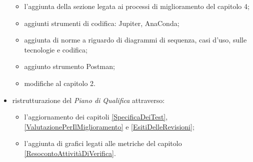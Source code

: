 \begin{itemize}
	\begin{itemize}
		\item l'aggiunta della sezione legata ai processi di miglioramento del capitolo 4;
		\item aggiunti strumenti di codifica: Jupiter, AnaConda;
		\item aggiunta di norme a riguardo di diagrammi di sequenza, casi d'uso, sulle tecnologie e codifica;
		\item aggiunto strumento Postman;
		\item modifiche al capitolo 2.
	\end{itemize}
	\item ristrutturazione del \textit{Piano di Qualifica} attraverso:
	\begin{itemize}
		\item l'aggiornamento dei capitoli \ref{SpecificaDeiTest}, \ref{ValutazionePerIlMiglioramento} e \ref{EsitiDelleRevisioni};
		\item l'aggiunta di grafici legati alle metriche del capitolo \ref{ResocontoAttivitàDiVerifica}.
	\end{itemize}
\end{itemize}

